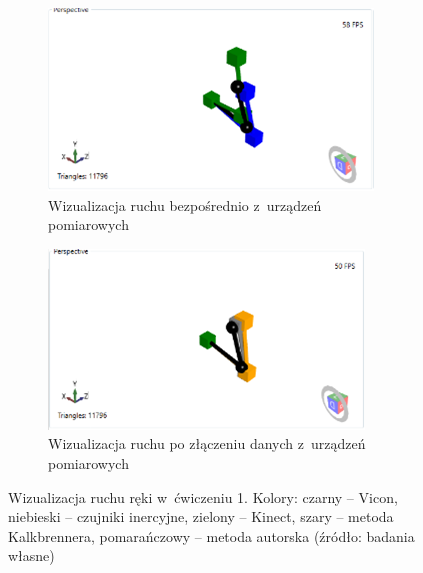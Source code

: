 \begin{savenotes}
	\begin{figure}[!htb]
		\captionsetup{singlelinecheck=off}
		\centering
		\begin{subfigure}[b]{0.75\textwidth}
			\centering
			\includegraphics[width=\textwidth]{images/100/raw.png}	
			\caption{Wizualizacja ruchu bezpośrednio z~urządzeń pomiarowych}
			\label{fig:experiments:first:raw}
		\end{subfigure}
																																					
		\begin{subfigure}[b]{0.75\textwidth}
			\centering
			\includegraphics[width=\textwidth]{images/100/Fused.png}		
			\caption{Wizualizacja ruchu po złączeniu danych z~urządzeń pomiarowych}
			\label{fig:experiments:first:fused}	
		\end{subfigure}
																																				
		\caption[Wizualizacja ruchu ręki w~ćwiczeniu 1]{Wizualizacja ruchu ręki w~ćwiczeniu 1.  Kolory: czarny -- Vicon, niebieski -- czujniki inercyjne, zielony -- Kinect, szary -- metoda Kalkbrennera, pomarańczowy -- metoda autorska (źródło: badania własne)}	
		\label{fig:experiments:first}
	\end{figure}
\end{savenotes}
														
